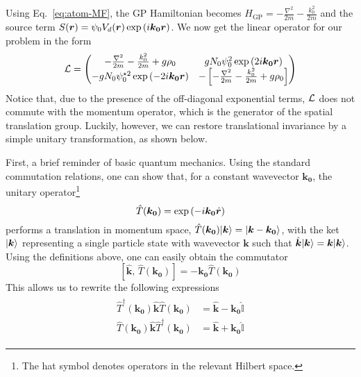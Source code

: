 Using Eq.~\eqref{eq:atom-MF}, the GP Hamiltonian becomes
$H_{\text{GP}} = -\frac{\nabla^2}{2m} - \frac{k_0^2}{2m}$ and the
source term
$S(\bm{r}) = \psi_0 V_d(\bm{r}) \exp \left( i \bm{k_0} \bm{r} \right)$. We now
get the linear operator for our problem in the form
%
\begin{equation}\label{eq:ourL}
  \mathcal{L} = \begin{pmatrix} -\frac{\nabla^2}{2m} - \frac{k_0^2}{2m} + g\rho_0 & g N_0 \psi_0^2 \exp \left( 2 i \bm{k_0} \bm{r} \right)\\ - g N_0 \psi_0^{\star 2} \exp \left( - 2 i \bm{k_0} \bm{r} \right) & -\left[ -\frac{\nabla^2}{2m} - \frac{k_0^2}{2m} + g\rho_0 \right] \end{pmatrix}
\end{equation}
% 
Notice that, due to the presence of the off-diagonal exponential
terms, $\mathcal{L}$ does not commute with the momentum operator, which is
the generator of the spatial translation group. Luckily, however, we
can restore translational invariance by a simple unitary
transformation, as shown below.

First, a brief reminder of basic quantum mechanics. Using the standard
commutation relations, one can show that, for a constant wavevector
$\bm{k_0}$, the unitary operator\footnote{The hat symbol denotes
  operators in the relevant Hilbert space.}
%
\begin{equation}\label{eq:trans-oper}
  \hat{T}(\bm{k_0}) = \exp \left( -i \bm{k_0} \hat{\bm{r}} \right)
\end{equation}
% 
performs a translation in momentum space,
$\hat{T}(\bm{k_0}) \vert \bm{k} \rangle = \vert \bm{k} - \bm{k_0} \rangle$, with the
ket $\vert \bm{k} \rangle$ representing a single particle state with
wavevector $\bm{k}$ such that
$\hat{\bm{k}} \vert \bm{k} \rangle = \bm{k} \vert \bm{k} \rangle$. Using the
definitions above, one can easily obtain the commutator
%
\begin{equation}\label{eq:trans-commutator}
  \left[ \hat{\bm{k}},\, \hat{T}(\bm{k_0}) \right] = -\bm{k_0}\hat{T}(\bm{k_0}) 
\end{equation}
% 
This allows us to rewrite the following expressions
\begin{align}\label{eq:products}
  \begin{split}
    \hat{T}^{\dagger}(\bm{k_0})\hat{\bm{k}}\hat{T}(\bm{k_0})& = \hat{\bm{k}} - \bm{k_0}\hat{\mathbb{I}}\\
    \hat{T}(\bm{k_0})\hat{\bm{k}}\hat{T}^{\dagger}(\bm{k_0})& = \hat{\bm{k}} + \bm{k_0}\hat{\mathbb{I}}  
  \end{split}
\end{align}

